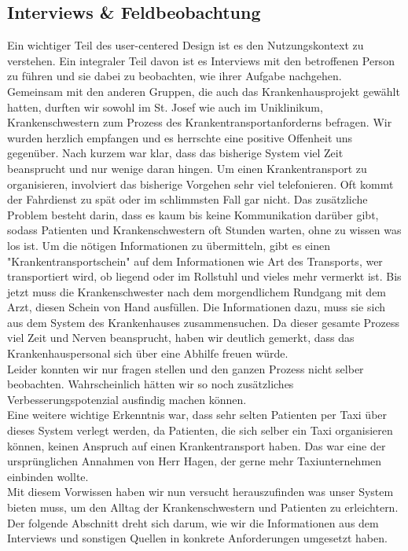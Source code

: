 \documentclass[a4paper, ngerman, 12pt]{scrartcl}
\begin{document}
\subsection{Interviews \& Feldbeobachtung}
Ein wichtiger Teil des user-centered Design ist es den Nutzungskontext zu verstehen. Ein integraler Teil davon ist es Interviews mit den betroffenen Person zu führen und sie dabei zu beobachten, wie ihrer Aufgabe nachgehen.\\
Gemeinsam mit den anderen Gruppen, die auch das Krankenhausprojekt gewählt hatten, durften wir sowohl im St. Josef wie auch im Uniklinikum, Krankenschwestern zum Prozess des Krankentransportanforderns befragen. Wir wurden herzlich empfangen und es herrschte eine positive Offenheit uns gegenüber. Nach kurzem war klar, dass das bisherige System viel Zeit beansprucht und nur wenige daran hingen. Um einen Krankentransport zu organisieren, involviert das bisherige Vorgehen sehr viel telefonieren. Oft kommt der Fahrdienst zu spät oder im schlimmsten Fall gar nicht. Das zusätzliche Problem besteht darin, dass es kaum bis keine Kommunikation darüber gibt, sodass Patienten und Krankenschwestern oft Stunden warten, ohne zu wissen was los ist. Um die nötigen Informationen zu übermitteln, gibt es einen "Krankentransportschein" auf dem Informationen wie Art des Transports, wer transportiert wird, ob liegend oder im Rollstuhl und vieles mehr vermerkt ist. Bis jetzt muss die Krankenschwester nach dem morgendlichem Rundgang mit dem Arzt, diesen Schein von Hand ausfüllen. Die Informationen dazu, muss sie sich aus dem System des Krankenhauses zusammensuchen. Da dieser gesamte Prozess viel Zeit und Nerven beansprucht, haben wir deutlich gemerkt, dass das Krankenhauspersonal sich über eine Abhilfe freuen würde.\\
Leider konnten wir nur fragen stellen und den ganzen Prozess nicht selber beobachten. Wahrscheinlich hätten wir so noch zusätzliches Verbesserungspotenzial ausfindig machen können.\\
Eine weitere wichtige Erkenntnis war, dass sehr selten Patienten per Taxi über dieses System verlegt werden, da Patienten, die sich selber ein Taxi organisieren können, keinen Anspruch auf einen Krankentransport haben. Das war eine der ursprünglichen Annahmen von Herr Hagen, der gerne mehr Taxiunternehmen einbinden wollte.\\
Mit diesem Vorwissen haben wir nun versucht herauszufinden was unser System bieten muss, um den Alltag der Krankenschwestern und Patienten zu erleichtern. Der folgende Abschnitt dreht sich darum, wie wir die Informationen aus dem Interviews und sonstigen Quellen in konkrete Anforderungen umgesetzt haben.\\
\end{document}
